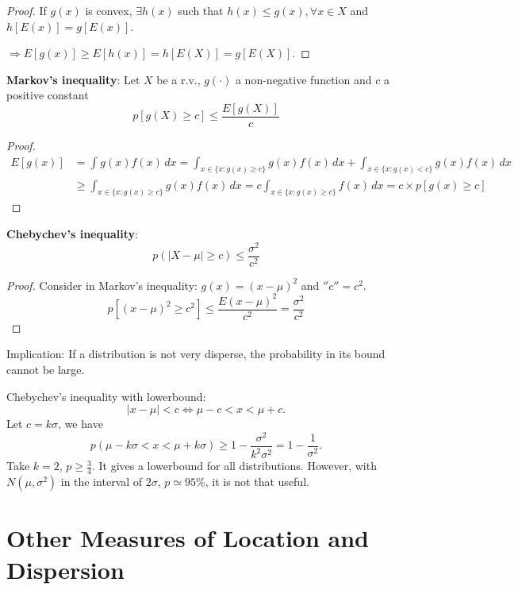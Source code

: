 \begin{proof}
    If $g(x)$ is convex, $\exists h(x)$ such that $h(x) \leq g(x), \forall x \in X$ and $h[E(x)] = g[E(x)]$.

    $\Longrightarrow E[g(x)] \geq  E[h(x)] = h[E(X)] = g[E(X)]$.
\end{proof}

\textbf{Markov's inequality}: Let $X$ be a r.v., $g(\cdot)$ a non-negative function and $c$ a positive constant \[
    p[g(X)\geq c] \leq \frac{E[g(X)]}{c}
\]
\begin{proof}
    \begin{align*}
        E[g(x)] & = \int_{}^{} g(x)f(x) \, dx = \int_{x \in \{x: g(x) \geq c\}} g(x)f(x) \, dx
        + \int_{x \in \{x: g(x) < c\}} g(x)f(x) \, dx                                                                                             \\
                & \geq  \int_{x \in \{x: g(x) \geq c\}} g(x)f(x) \, dx = c \int_{x \in \{x: g(x) \geq c\}} f(x)  \, dx = c \times  p[g(x) \geq c]
    \end{align*}
\end{proof}

\textbf{Chebychev's inequality}: \[
    p(\left| X-\mu \right| \geq c ) \leq \frac{\sigma ^{2}}{c ^{2}}
\]
\begin{proof}
    Consider in Markov's inequality: $g(x) = (x-\mu)^{2}$ and $''c'' = c ^{2}$. \[
        p[(x-\mu)^{2} \geq c ^{2}] \leq \frac{E(x-\mu)^{2}}{c ^{2}} = \frac{\sigma ^{2}}{c ^{2}}
    \]
\end{proof}

\begin{remark*}
    Implication: If a distribution is not very disperse, the probability in its bound cannot be large.
\end{remark*}

Chebychev's inequality with lowerbound: \[
    \left| x - \mu \right| < c \iff \mu -c < x < \mu + c.
\]
Let $c = k \sigma$, we have \[
    p(\mu - k\sigma < x < \mu + k\sigma) \geq 1 - \frac{\sigma ^{2}}{k ^{2} \sigma ^{2}} = 1 - \frac{1}{\sigma ^{2}}.
\] Take $k = 2$, $p\geq \frac{3}{4}$. It gives a lowerbound for all distributions. However, with $N(\mu,\sigma ^{2})$ in the interval of $2\sigma$, $p \simeq 95\%$, it is not that useful.

\section{Other Measures of Location and Dispersion}

